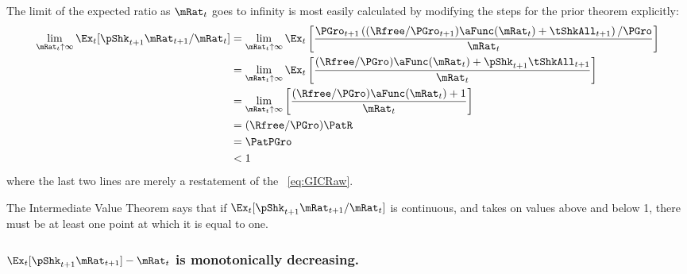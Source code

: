 \documentclass[\econtexRoot/BufferStockTheory]{subfiles}
\begin{document}
The limit of the expected ratio as $\mRat_{t}$ goes to infinity is most easily calculated by modifying the steps for the prior theorem explicitly:
\begin{equation}\begin{gathered}\begin{aligned}
  \lim_{\mRat_{t} \uparrow \infty} \Ex_{t}[\pShk_{t+1}\mRat_{t+1}/\mRat_{t}]  & =   
                                                                  \lim_{\mRat_{t} \uparrow \infty} 
                                                                  \Ex_{t}\left[\frac{\PGro_{t+1}\left((\Rfree/\PGro_{t+1})\aFunc(\mRat_{t})+{\tShkAll}_{t+1}\right)/\PGro}{\mRat_{t}}\right] \notag 
  \\   & =   \lim_{\mRat_{t} \uparrow \infty} \Ex_{t}\left[
         \frac{(\Rfree/\PGro)\aFunc(\mRat_{t})+\pShk_{t+1}{\tShkAll}_{t+1}}{\mRat_{t}}
         \right] \notag 
  \\   & =   \lim_{\mRat_{t} \uparrow \infty} \left[
         \frac{(\Rfree/\PGro)\aFunc(\mRat_{t})+1}{\mRat_{t}}
         \right] \notag 
  \\  & = (\Rfree/\PGro)\PatR \label{eq:emgro2}
  \\  & = \PatPGro \notag
  \\  & < 1 \notag
\end{aligned}\end{gathered}\end{equation}
where the last two lines are merely a restatement of the \GICRaw~\eqref{eq:GICRaw}.

The Intermediate Value Theorem says that if $\Ex_{t}[\pShk_{t+1}\mRat_{t+1}/\mRat_t]$ is continuous, and takes on values above and below 1, there must be at least one point at which it is equal to one.

\subsubsection{\texorpdfstring{$\Ex_{t}[\pShk_{t+1}\mRat_{t+1}] -\mRat_t$}{pShk mRat-{t+1} --- mRat-{t}} is monotonically decreasing.}
\end{document}
